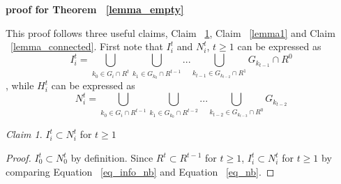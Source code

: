 \documentclass[12pt,letterpaper]{article}
\newtheorem*{main result}{Main Result}
\theoremstyle{definition}
\theoremstyle{remark}
\theoremstyle{claim}
\newtheorem{claim}{Claim}
\begin{document}
\bigskip
\noindent\textbf{proof for Theorem ~\ref{lemma_empty}}

This proof follows three useful claims, Claim ~\ref{lemma_I_subset_N}, Claim ~\ref{lemma1} and Claim ~\ref{lemma_connected}. First note that $I^t_i$ and $N^t_i$, $t\geq 1$ can be expressed as 
\begin{equation}
\label{eq_info_nb}
I^{t}_i = \bigcup_{k_0\in G_i\cap R^{t}}\bigcup_{k_1\in G_{k_0}\cap R^{t-1}}...\bigcup_{k_{t-1}\in G_{k_{t-2}}\cap R^{1}}G_{k_{t-1}}\cap R^0
\end{equation}
, while $H^t_i$ can be expressed as
\begin{equation}
\label{eq_nb}
N^t_i = \bigcup_{k_0\in G_i\cap R^{t-1}}\bigcup_{k_1\in G_{k_0}\cap R^{t-2}}...\bigcup_{k_{t-2}\in G_{k_{t-3}}\cap R^{0}}G_{k_{t-2}}
\end{equation}

\begin{claim}
\label{lemma_I_subset_N}
$I^t_i\subset N^t_i$ for $t\geq 1$
\end{claim}
\begin{proof}
$I^t_0\subset N^t_0$ by definition. Since $R^t\subset R^{t-1}$ for $t\geq 1$, $I^t_i\subset N^t_i$ for $t\geq 1$ by comparing Equation ~\ref{eq_info_nb} and Equation ~\ref{eq_nb}.
\end{proof}
\end{document}
